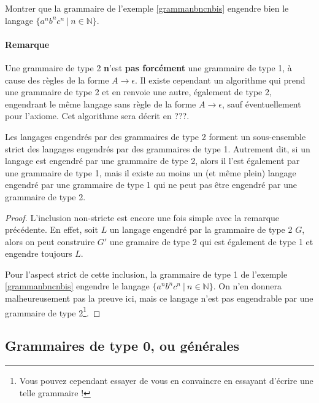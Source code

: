 \begin{exercice}
Montrer que la grammaire de l'exemple \ref{grammanbncnbis} engendre bien le langage \newline $\{a^nb^nc^n ~|~ n \in \mathbb{N}\}$.
\end{exercice}

\paragraph{Remarque} Une grammaire de type 2 \textbf{n}'est \textbf{pas forcément} une grammaire de type 1, à cause des règles de la forme $A \rightarrow \epsilon$. Il existe cependant un algorithme qui prend une grammaire de type 2 et en renvoie une autre, également de type 2, engendrant le même langage sans règle de la forme $A \rightarrow \epsilon$, sauf éventuellement pour l'axiome. Cet algorithme sera décrit en ???. %


\begin{lemma}
Les langages engendrés par des grammaires de type 2 forment un sous-ensemble strict des langages engendrés par des grammaires de type 1. Autrement dit, si un langage est engendré par une grammaire de type 2, alors il l'est également par une grammaire de type 1, mais il existe au moins un (et même plein) langage engendré par une grammaire de type 1 qui ne peut pas être engendré par une grammaire de type 2.  
\end{lemma}

\begin{proof}
L'inclusion non-stricte est encore une fois simple avec la remarque précédente. En effet, soit $L$ un langage engendré par la grammaire de type 2 $G$, alors on peut construire $G'$ une gramaire de type 2 qui est également de type 1 et engendre toujours $L$.

Pour l'aspect strict de cette inclusion, la grammaire de type 1 de l'exemple \ref{grammanbncnbis} engendre le langage $\{a^nb^nc^n ~|~ n \in \mathbb{N}\}$. On n'en donnera malheureusement pas la preuve ici, mais ce langage n'est pas engendrable par une grammaire de type 2\footnote{Vous pouvez cependant essayer de vous en convaincre en essayant d'écrire une telle grammaire !}.
\end{proof}






\subsection{Grammaires de type 0, ou générales}

